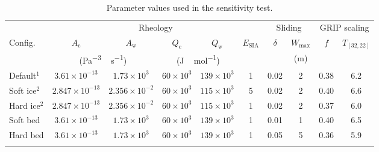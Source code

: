 \documentclass[tc, manuscript]{copernicus}
\begin{document}
\begin{table*}
\caption{%
      Parameter values used in the sensitivity test.}
\label{tab:sens_params}
{\begin{tabular}{l|ccccc|cc|cc}
    \tophline
            & \multicolumn{5}{c|}{Rheology}
            & \multicolumn{2}{c|}{Sliding}
            & \multicolumn{2}{c}{GRIP scaling} \\
    Config. & $A_{\mathrm{c}}$ & $A_{\mathrm{w}}$
            & $Q_{\mathrm{c}}$ & $Q_{\mathrm{w}}$
            & $E_{\text{SIA}}$ & $\delta$ & $W_{\text{max}}$
            & $f$ & $T_{[32, 22]}$ \\
            & \multicolumn{2}{c}{(\unit{Pa^{-3}\,s^{-1}})}
            & \multicolumn{2}{c}{(\unit{J\,mol^{-1}})}
            & & & (\unit{m}) \\
    \middlehline
    Default$^1$  & $ 3.61\times 10^{-13}$
                 & $ 1.73\times 10^3$
                 & $   60\times 10^3$
                 & $  139\times 10^3$
                 & 1 & 0.02 & 2 & 0.38 & 6.2 \\
    \cline{1-10}
    Soft ice$^2$ & $2.847\times 10^{-13}$
                 & $2.356\times 10^{-2}$
                 & $   60\times 10^3$
                 & $  115\times 10^3$
                 & 5 & 0.02 & 2 & 0.40 & 6.6 \\
    Hard ice$^2$ & $2.847\times 10^{-13}$
                 & $2.356\times 10^{-2}$
                 & $   60\times 10^3$
                 & $  115\times 10^3$
                 & 1 & 0.02 & 2 & 0.37 & 6.0 \\
    \cline{1-10}
    Soft bed     & $ 3.61\times 10^{-13}$
                 & $ 1.73\times 10^3$
                 & $   60\times 10^3$
                 & $  139\times 10^3$
                 & 1 & 0.01 & 1 & 0.40 & 6.5 \\
    Hard bed     & $ 3.61\times 10^{-13}$
                 & $ 1.73\times 10^3$
                 & $   60\times 10^3$
                 & $  139\times 10^3$
                 & 1 & 0.05 & 5 & 0.36 & 5.9 \\
    \bottomhline
\end{tabular}}
\end{table*}


\clearpage{}  %
\end{document}
